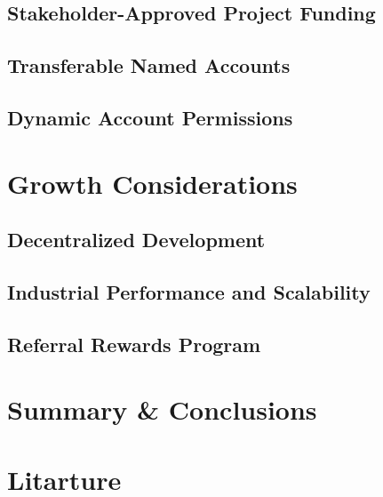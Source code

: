\documentclass[letterpaper, 10 pt, conference]{ieeeconf}
\begin{document}
\subsection{Stakeholder-Approved Project Funding}
\subsection{Transferable Named Accounts}
\subsection{Dynamic Account Permissions}

\section{Growth Considerations}
\subsection{Decentralized Development}
\subsection{Industrial Performance and Scalability}
\subsection{Referral Rewards Program}

\section{Summary \& Conclusions}

\section*{Litarture}
\end{document}
